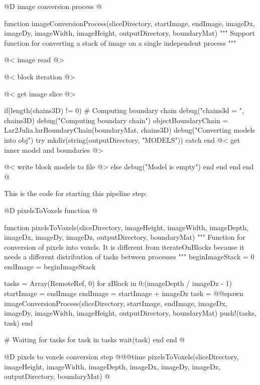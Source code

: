 \documentclass[11pt,oneside]{article}	%
\begin{document}
@D image conversion process
@{function imageConversionProcess(sliceDirectory,
			      startImage, endImage,
			      imageDx, imageDy,
			      imageWidth, imageHeight,
			      outputDirectory,
			      boundaryMat)
  """
  Support function for converting a stack of image on a single
  independent process
  """

  @< image read @>
  
  @< block iteration @>

      @< get image slice @>
      
      if(length(chains3D) != 0)
        # Computing boundary chain
        debug("chains3d = ", chains3D)
        debug("Computing boundary chain")
        objectBoundaryChain = Lar2Julia.larBoundaryChain(boundaryMat, chains3D)
        debug("Converting models into obj")
        try
          mkdir(string(outputDirectory, "MODELS"))
        catch
        end
        @< get inner model and boundaries @>
        
        @< write block models to file @>
      else
        debug("Model is empty")
      end
    end
  end
end @}

This is the code for starting this pipeline step:

@D pixelsToVoxels function
@{function pixelsToVoxels(sliceDirectory,
                        imageHeight, imageWidth, imageDepth,
                        imageDx, imageDy, imageDz,
                        outputDirectory,
                        boundaryMat)
  """
  Function for conversion of pixels into voxels. It is different
  from iterateOnBlocks because it needs a different distribution
  of tasks between processes
  """
  beginImageStack = 0
  endImage = beginImageStack

  tasks = Array(RemoteRef, 0)
  for zBlock in 0:(imageDepth / imageDz - 1)
    startImage = endImage
    endImage = startImage + imageDz
    task = @@spawn imageConversionProcess(sliceDirectory,
                                         startImage, endImage,
                                         imageDx, imageDy,
                                         imageWidth, imageHeight,
                                         outputDirectory,
                                         boundaryMat)
    push!(tasks, task)
  end

  # Waiting for tasks
  for task in tasks
    wait(task)
  end
end @}

@D pixels to voxels conversion step
@{@@time pixelsToVoxels(sliceDirectory,
                    imageHeight, imageWidth, imageDepth,
                    imageDx, imageDy, imageDz,
                    outputDirectory,
                    boundaryMat) @}
                    
\end{document}
